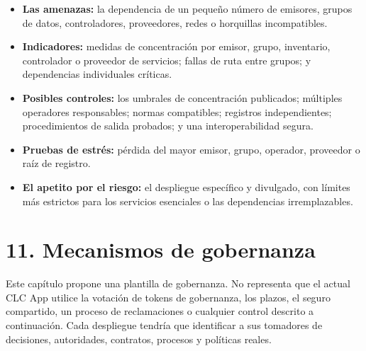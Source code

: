 \documentclass[11pt]{article}
\begin{document}
\begin{itemize}[leftmargin=*]
\item \textbf{Las amenazas:} la dependencia de un pequeño número de emisores, grupos de datos, controladores, proveedores, redes o horquillas incompatibles.
\item \textbf{Indicadores:} medidas de concentración por emisor, grupo, inventario, controlador o proveedor de servicios; fallas de ruta entre grupos; y dependencias individuales críticas.
\item \textbf{Posibles controles:} los umbrales de concentración publicados; múltiples operadores responsables; normas compatibles; registros independientes; procedimientos de salida probados; y una interoperabilidad segura.
\item \textbf{Pruebas de estrés:} pérdida del mayor emisor, grupo, operador, proveedor o raíz de registro.
\item \textbf{El apetito por el riesgo:} el despliegue específico y divulgado, con límites más estrictos para los servicios esenciales o las dependencias irremplazables.
\end{itemize}

\section*{11. Mecanismos de gobernanza}

Este capítulo propone una plantilla de gobernanza. No representa que el actual CLC App utilice la votación de tokens de gobernanza, los plazos, el seguro compartido, un proceso de reclamaciones o cualquier control descrito a continuación. Cada despliegue tendría que identificar a sus tomadores de decisiones, autoridades, contratos, procesos y políticas reales.
\end{document}
